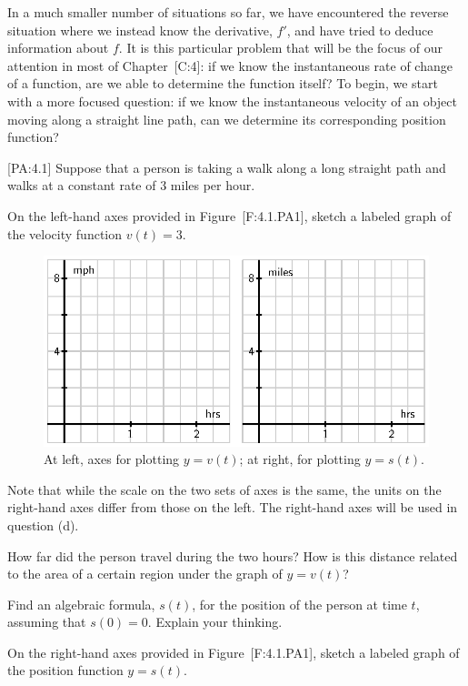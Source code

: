 In a much smaller number of situations so far, we have encountered the
reverse situation where we instead know the derivative, \(f'\), and have
tried to deduce information about \(f\). It is this particular problem
that will be the focus of our attention in most of Chapter~{[}C:4{]}: if
we know the instantaneous rate of change of a function, are we able to
determine the function itself? To begin, we start with a more focused
question: if we know the instantaneous velocity of an object moving
along a straight line path, can we determine its corresponding position
function?

{[}PA:4.1{]} Suppose that a person is taking a walk along a long
straight path and walks at a constant rate of 3 miles per hour.

On the left-hand axes provided in Figure~{[}F:4.1.PA1{]}, sketch a
labeled graph of the velocity function \(v(t) = 3\).

\begin{figure}[htbp]
\centering
\includegraphics{figures/4_1_PA1.eps}
\caption{At left, axes for plotting \(y = v(t)\); at right, for plotting
\(y = s(t)\).{}}
\end{figure}

Note that while the scale on the two sets of axes is the same, the units
on the right-hand axes differ from those on the left. The right-hand
axes will be used in question (d).

How far did the person travel during the two hours? How is this distance
related to the area of a certain region under the graph of \(y = v(t)\)?

Find an algebraic formula, \(s(t)\), for the position of the person at
time \(t\), assuming that \(s(0) = 0\). Explain your thinking.

On the right-hand axes provided in Figure~{[}F:4.1.PA1{]}, sketch a
labeled graph of the position function \(y = s(t)\).

